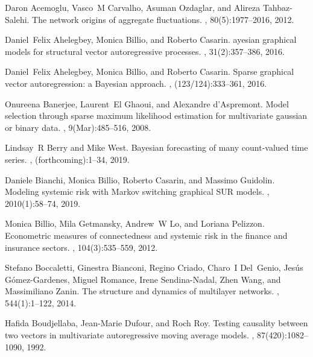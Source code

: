 \documentclass[12pt,a4paper]{article}
\theoremstyle{custom}
\begin{document}
\begin{thebibliography}{10}

Daron Acemoglu, Vasco~M Carvalho, Asuman Ozdaglar, and Alireza Tahbaz-Salehi.
\newblock The network origins of aggregate fluctuations.
, 80(5):1977--2016, 2012.

Daniel~Felix Ahelegbey, Monica Billio, and Roberto Casarin.
ayesian graphical models for structural vector autoregressive
  processes.
, 31(2):357--386, 2016.

Daniel~Felix Ahelegbey, Monica Billio, and Roberto Casarin.
\newblock Sparse graphical vector autoregression: a {Bayesian} approach.
, (123/124):333--361, 2016.

Onureena Banerjee, Laurent~El Ghaoui, and Alexandre d'Aspremont.
\newblock Model selection through sparse maximum likelihood estimation for
  multivariate gaussian or binary data.
, 9(Mar):485--516, 2008.

Lindsay~R Berry and Mike West.
\newblock Bayesian forecasting of many count-valued time series.
,
  (forthcoming):1--34, 2019.

Daniele Bianchi, Monica Billio, Roberto Casarin, and Massimo Guidolin.
\newblock Modeling systemic risk with {Markov} switching graphical {SUR}
  models.
, 2010(1):58--74, 2019.

Monica Billio, Mila Getmansky, Andrew~W Lo, and Loriana Pelizzon.
\newblock Econometric measures of connectedness and systemic risk in the
  finance and insurance sectors.
, 104(3):535--559, 2012.

Stefano Boccaletti, Ginestra Bianconi, Regino Criado, Charo~I Del~Genio,
  Jes{\'u}s G{\'o}mez-Gardenes, Miguel Romance, Irene Sendina-Nadal, Zhen Wang,
  and Massimiliano Zanin.
\newblock The structure and dynamics of multilayer networks.
, 544(1):1--122, 2014.

Hafida Boudjellaba, Jean-Marie Dufour, and Roch Roy.
\newblock Testing causality between two vectors in multivariate autoregressive
  moving average models.
,
  87(420):1082--1090, 1992.


\end{thebibliography}
\end{document}
